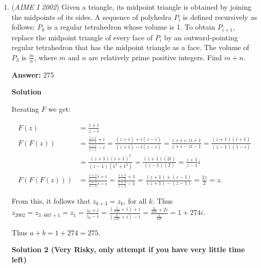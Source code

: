 \begin{enumerate}
 Clearly $t$ must be an integer. As $7$ and $12$ are relatively prime, the smallest solution is $t=12$. At this moment the second photon will be at the coordinates $(12\cdot 12,7\cdot 12,5\cdot 12)$.

 Then the distance it travelled is $\sqrt{ (12\cdot 12)^2 + (7\cdot 12)^2 + (5\cdot 12)^2 } = 12\sqrt{12^2 + 7^2 + 5^2}=12\sqrt{218}$.And as the factorization of $218$ is $218=2\cdot 109$, we have $m=12$ and $n=218$, hence $m+n=\boxed{230}$.

 


	\item (\textit{AIME I 2002}) Given a triangle, its midpoint triangle is obtained by joining the midpoints of its sides. A sequence of polyhedra $P_{i}$ is defined recursively as follows: $P_{0}$ is a regular tetrahedron whose volume is 1. To obtain $P_{i + 1}$, replace the midpoint triangle of every face of $P_{i}$ by an outward-pointing regular tetrahedron that has the midpoint triangle as a face. The volume of $P_{3}$ is $\frac {m}{n}$, where $m$ and $n$ are relatively prime positive integers. Find $m + n$.


 
 \textbf{Answer: }275



\textbf{Solution}

Iterating $F$ we get:

 
 \begin{align*} F(z) &= \frac{z+i}{z-i}\\ F(F(z)) &= \frac{\frac{z+i}{z-i}+i}{\frac{z+i}{z-i}-i} = \frac{(z+i)+i(z-i)}{(z+i)-i(z-i)}= \frac{z+i+zi+1}{z+i-zi-1}= \frac{(z+1)(i+1)}{(z-1)(1-i)}\\ &= \frac{(z+1)(i+1)^2}{(z-1)(1^2+1^2)}= \frac{(z+1)(2i)}{(z-1)(2)}= \frac{z+1}{z-1}i\\ F(F(F(z))) &= \frac{\frac{z+1}{z-1}i+i}{\frac{z+1}{z-1}i-i} = \frac{\frac{z+1}{z-1}+1}{\frac{z+1}{z-1}-1} = \frac{(z+1)+(z-1)}{(z+1)-(z-1)} = \frac{2z}{2} = z. \end{align*}


 From this, it follows that $z_{k+3} = z_k$, for all $k$. Thus $z_{2002} = z_{3\cdot 667+1} = z_1 = \frac{z_0+i}{z_0-i} = \frac{(\frac{1}{137}+i)+i}{(\frac{1}{137}+i)-i}= \frac{\frac{1}{137}+2i}{\frac{1}{137}}= 1+274i.$

 Thus $a+b = 1+274 = \boxed{275}$.

 



\textbf{Solution 2 (Very Risky, only attempt if you have very little time left)}


\end{enumerate}
